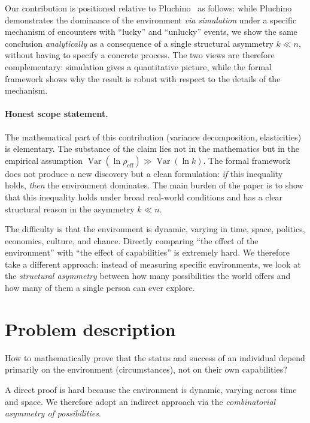 \documentclass[12pt,a4paper]{article}
\begin{document}
Our contribution is positioned relative to Pluchino~\cite{pluchino2018} as follows: while Pluchino demonstrates the dominance of the environment \emph{via simulation} under a specific mechanism of encounters with ``lucky'' and ``unlucky'' events, we show the same conclusion \emph{analytically} as a consequence of a single structural asymmetry $k \ll n$, without having to specify a concrete process. The two views are therefore complementary: simulation gives a quantitative picture, while the formal framework shows why the result is robust with respect to the details of the mechanism.

\paragraph{Honest scope statement.} The mathematical part of this contribution (variance decomposition, elasticities) is elementary. The substance of the claim lies not in the mathematics but in the empirical assumption $\operatorname{Var}(\ln \rho_{\text{eff}}) \gg \operatorname{Var}(\ln k)$. The formal framework does not produce a new discovery but a clean formulation: \emph{if} this inequality holds, \emph{then} the environment dominates. The main burden of the paper is to show that this inequality holds under broad real-world conditions and has a clear structural reason in the asymmetry $k \ll n$.

The difficulty is that the environment is dynamic, varying in time, space, politics, economics, culture, and chance. Directly comparing ``the effect of the environment'' with ``the effect of capabilities'' is extremely hard. We therefore take a different approach: instead of measuring specific environments, we look at the \emph{structural asymmetry} between how many possibilities the world offers and how many of them a single person can ever explore.

\section{Problem description}

How to mathematically prove that the status and success of an individual depend primarily on the environment (circumstances), not on their own capabilities?

A direct proof is hard because the environment is dynamic, varying across time and space. We therefore adopt an indirect approach via the \emph{combinatorial asymmetry of possibilities}.
\end{document}
